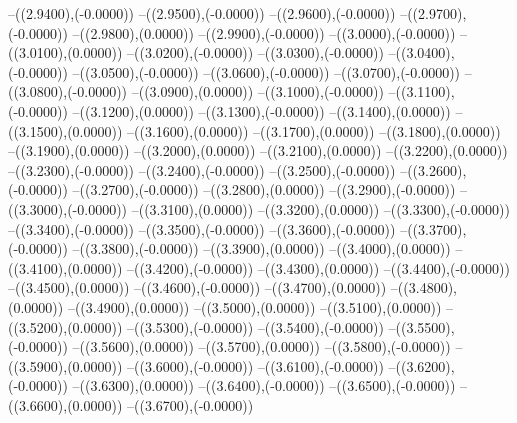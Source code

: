 {	--({\sx*(2.9400)},{\sy*(-0.0000)})
	--({\sx*(2.9500)},{\sy*(-0.0000)})
	--({\sx*(2.9600)},{\sy*(-0.0000)})
	--({\sx*(2.9700)},{\sy*(-0.0000)})
	--({\sx*(2.9800)},{\sy*(0.0000)})
	--({\sx*(2.9900)},{\sy*(-0.0000)})
	--({\sx*(3.0000)},{\sy*(-0.0000)})
	--({\sx*(3.0100)},{\sy*(0.0000)})
	--({\sx*(3.0200)},{\sy*(-0.0000)})
	--({\sx*(3.0300)},{\sy*(-0.0000)})
	--({\sx*(3.0400)},{\sy*(-0.0000)})
	--({\sx*(3.0500)},{\sy*(-0.0000)})
	--({\sx*(3.0600)},{\sy*(-0.0000)})
	--({\sx*(3.0700)},{\sy*(-0.0000)})
	--({\sx*(3.0800)},{\sy*(-0.0000)})
	--({\sx*(3.0900)},{\sy*(0.0000)})
	--({\sx*(3.1000)},{\sy*(-0.0000)})
	--({\sx*(3.1100)},{\sy*(-0.0000)})
	--({\sx*(3.1200)},{\sy*(0.0000)})
	--({\sx*(3.1300)},{\sy*(-0.0000)})
	--({\sx*(3.1400)},{\sy*(0.0000)})
	--({\sx*(3.1500)},{\sy*(0.0000)})
	--({\sx*(3.1600)},{\sy*(0.0000)})
	--({\sx*(3.1700)},{\sy*(0.0000)})
	--({\sx*(3.1800)},{\sy*(0.0000)})
	--({\sx*(3.1900)},{\sy*(0.0000)})
	--({\sx*(3.2000)},{\sy*(0.0000)})
	--({\sx*(3.2100)},{\sy*(0.0000)})
	--({\sx*(3.2200)},{\sy*(0.0000)})
	--({\sx*(3.2300)},{\sy*(-0.0000)})
	--({\sx*(3.2400)},{\sy*(-0.0000)})
	--({\sx*(3.2500)},{\sy*(-0.0000)})
	--({\sx*(3.2600)},{\sy*(-0.0000)})
	--({\sx*(3.2700)},{\sy*(-0.0000)})
	--({\sx*(3.2800)},{\sy*(0.0000)})
	--({\sx*(3.2900)},{\sy*(-0.0000)})
	--({\sx*(3.3000)},{\sy*(-0.0000)})
	--({\sx*(3.3100)},{\sy*(0.0000)})
	--({\sx*(3.3200)},{\sy*(0.0000)})
	--({\sx*(3.3300)},{\sy*(-0.0000)})
	--({\sx*(3.3400)},{\sy*(-0.0000)})
	--({\sx*(3.3500)},{\sy*(-0.0000)})
	--({\sx*(3.3600)},{\sy*(-0.0000)})
	--({\sx*(3.3700)},{\sy*(-0.0000)})
	--({\sx*(3.3800)},{\sy*(-0.0000)})
	--({\sx*(3.3900)},{\sy*(0.0000)})
	--({\sx*(3.4000)},{\sy*(0.0000)})
	--({\sx*(3.4100)},{\sy*(0.0000)})
	--({\sx*(3.4200)},{\sy*(-0.0000)})
	--({\sx*(3.4300)},{\sy*(0.0000)})
	--({\sx*(3.4400)},{\sy*(-0.0000)})
	--({\sx*(3.4500)},{\sy*(0.0000)})
	--({\sx*(3.4600)},{\sy*(-0.0000)})
	--({\sx*(3.4700)},{\sy*(0.0000)})
	--({\sx*(3.4800)},{\sy*(0.0000)})
	--({\sx*(3.4900)},{\sy*(0.0000)})
	--({\sx*(3.5000)},{\sy*(0.0000)})
	--({\sx*(3.5100)},{\sy*(0.0000)})
	--({\sx*(3.5200)},{\sy*(0.0000)})
	--({\sx*(3.5300)},{\sy*(-0.0000)})
	--({\sx*(3.5400)},{\sy*(-0.0000)})
	--({\sx*(3.5500)},{\sy*(-0.0000)})
	--({\sx*(3.5600)},{\sy*(0.0000)})
	--({\sx*(3.5700)},{\sy*(0.0000)})
	--({\sx*(3.5800)},{\sy*(-0.0000)})
	--({\sx*(3.5900)},{\sy*(0.0000)})
	--({\sx*(3.6000)},{\sy*(-0.0000)})
	--({\sx*(3.6100)},{\sy*(-0.0000)})
	--({\sx*(3.6200)},{\sy*(-0.0000)})
	--({\sx*(3.6300)},{\sy*(0.0000)})
	--({\sx*(3.6400)},{\sy*(-0.0000)})
	--({\sx*(3.6500)},{\sy*(-0.0000)})
	--({\sx*(3.6600)},{\sy*(0.0000)})
	--({\sx*(3.6700)},{\sy*(-0.0000)})
}
